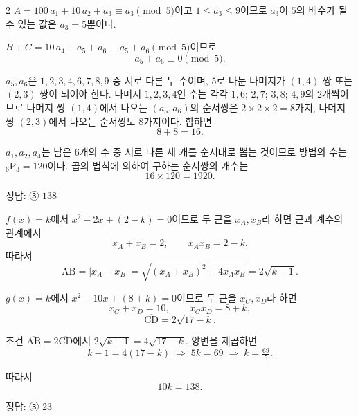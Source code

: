 \documentclass[10pt]{article}
\begin{document}
\begin{multicols}{2}
$A = 100\, a_1 + 10\, a_2 + a_3 \equiv a_3 \pmod 5$이고 $1 \le a_3 \le 9$이므로 $a_3$이 $5$의 배수가 될 수 있는 값은 $a_3 = 5$뿐이다.

$B + C = 10\, a_4 + a_5 + a_6 \equiv a_5 + a_6 \pmod 5$이므로
\[ a_5 + a_6 \equiv 0 \pmod{5}. \]

$a_5, a_6$은 $1, 2, 3, 4, 6, 7, 8, 9$ 중 서로 다른 두 수이며, $5$로 나눈 나머지가 $(1, 4)$ 쌍 또는 $(2, 3)$ 쌍이 되어야 한다. 나머지 $1, 2, 3, 4$인 수는 각각 $1, 6$; $2, 7$; $3, 8$; $4, 9$의 $2$개씩이므로 나머지 쌍 $(1, 4)$에서 나오는 $(a_5, a_6)$의 순서쌍은 $2 \times 2 \times 2 = 8$가지, 나머지 쌍 $(2, 3)$에서 나오는 순서쌍도 $8$가지이다. 합하면
\[ 8 + 8 = 16. \]

$a_1, a_2, a_4$는 남은 $6$개의 수 중 서로 다른 세 개를 순서대로 뽑는 것이므로 방법의 수는 ${}_6\mathrm{P}_3 = 120$이다. 곱의 법칙에 의하여 구하는 순서쌍의 개수는
\[ 16 \times 120 = 1920. \]


\begin{answerbox}정답: ③ $138$\end{answerbox}

$f(x) = k$에서 $x^2 - 2x + (2 - k) = 0$이므로 두 근을 $x_A, x_B$라 하면 근과 계수의 관계에서
\[ x_A + x_B = 2,\qquad x_A x_B = 2 - k. \]
따라서
\[ \overline{\mathrm{AB}} = |x_A - x_B| = \sqrt{(x_A + x_B)^2 - 4 x_A x_B} = 2\sqrt{k - 1}. \]

$g(x) = k$에서 $x^2 - 10x + (8 + k) = 0$이므로 두 근을 $x_C, x_D$라 하면
\[ x_C + x_D = 10,\qquad x_C x_D = 8 + k, \]
\[ \overline{\mathrm{CD}} = 2\sqrt{17 - k}. \]

조건 $\overline{\mathrm{AB}} = 2\overline{\mathrm{CD}}$에서 $2\sqrt{k - 1} = 4\sqrt{17 - k}$. 양변을 제곱하면
\[ k - 1 = 4(17 - k) \;\Rightarrow\; 5k = 69 \;\Rightarrow\; k = \tfrac{69}{5}. \]

따라서
\[ 10k = 138. \]


\begin{answerbox}정답: ③ $23$\end{answerbox}


\end{multicols}
\end{document}
